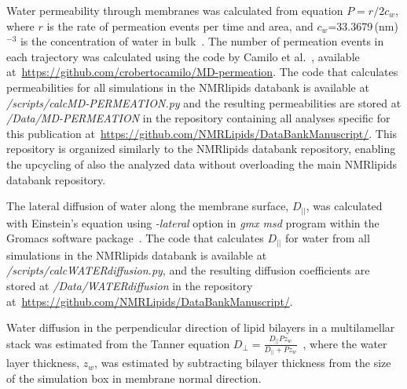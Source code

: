 \documentclass[fleqn,10pt]{wlscirep}
\begin{document}
Water permeability through membranes was calculated from equation $P=r/2c_w$, where $r$ is the rate of permeation events per time and area, and $c_w$=33.3679\,(nm)$^{-3}$ is the concentration of water in bulk~\cite{venable19}. The number of permeation events in each trajectory was calculated using the code by Camilo et al.~\cite{camilo2022}, available at~\url{https://github.com/crobertocamilo/MD-permeation}. 
The code that calculates permeabilities for all simulations in the NMRlipids databank is available at {\it /scripts/calcMD-PERMEATION.py} and the resulting permeabilities are stored at {\it /Data/MD-PERMEATION} in the repository containing all analyses specific for this publication at~\url{https://github.com/NMRLipids/DataBankManuscript/}. 
This repository is organized similarly to the NMRlipids databank repository, enabling the upcycling of also the analyzed data without overloading the main NMRlipids databank repository. 

The lateral diffusion of water along the membrane surface, $D_{||}$, was calculated with Einstein's equation using {\it -lateral} option in {\it gmx msd} program within the Gromacs software package~\cite{gromacsMANUAL}. The code that calculates $D_{||}$ for water from all simulations in the NMRlipids databank is available at {\it /scripts/calcWATERdiffusion.py}, and the resulting diffusion coefficients are stored at {\it /Data/WATERdiffusion} in the repository at~\url{https://github.com/NMRLipids/DataBankManuscript/}.

Water diffusion in the perpendicular direction of lipid bilayers in a multilamellar stack was estimated from the Tanner equation $D_\perp = \frac{D_{||} P z_w}{D_{||} + P z_w}$~\cite{tanner78,wasterby02}, where the water layer thickness, $z_w$, was estimated by subtracting bilayer thickness from the size of the simulation box in membrane normal direction.
\end{document}
